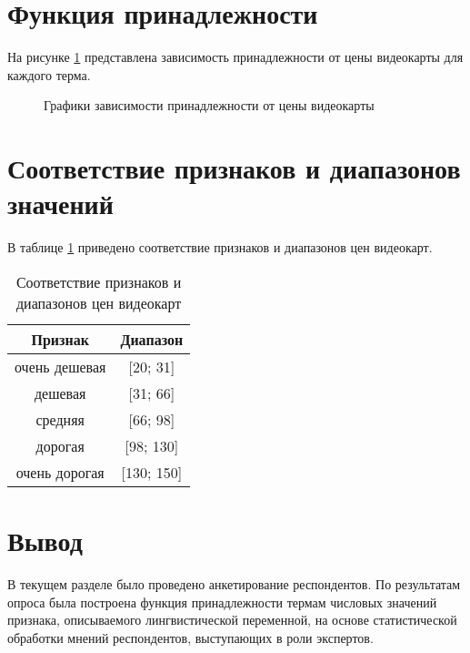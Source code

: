 \section{Функция принадлежности}

На рисунке \ref{plt:res} представлена зависимость принадлежности от цены видеокарты для каждого терма.

\begin{figure}[H]
	\caption{Графики зависимости принадлежности от цены видеокарты}
	\label{plt:res}
\end{figure}

\section{Соответствие признаков и диапазонов значений}

В таблице \ref{tbl:prizn} приведено соответствие признаков и диапазонов цен видеокарт.

\begin{table}[H]
	\centering
	\caption{Соответствие признаков и диапазонов цен видеокарт}
	\label{tbl:prizn}
	\begin{tabular}{ |c|c| }
		\hline
	  	Признак 		& Диапазон\\
	  	\hline
	  	очень дешевая	& [20; 31]\\
	  	\hline
	  	дешевая 		& [31; 66]\\
	  	\hline
	  	средняя 		& [66; 98]\\
	  	\hline
	  	дорогая 		& [98; 130]\\
	  	\hline
	  	очень дорогая 	& [130; 150]\\
	  	\hline
	\end{tabular}
\end{table}

\section*{Вывод}

В текущем разделе было проведено анкетирование респондентов. 
По результатам опроса была построена функция принадлежности термам числовых значений признака, описываемого лингвистической переменной, на основе статистической обработки мнений респондентов, выступающих в роли экспертов.
